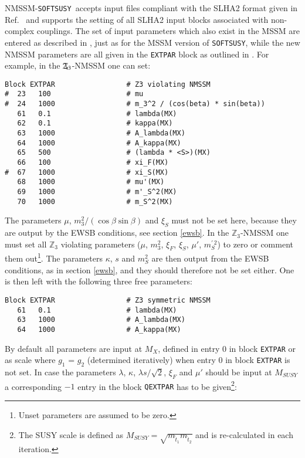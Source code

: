 \documentclass[final,3p,times,pdflatex]{elsarticle}
\def\SOFTSUSY{{\tt SOFTSUSY}}
\def\code#1{\small{\tt #1}\normalsize}
\newcommand{\Zv}{\,\mathbf{\backslash}\mkern-11.0mu{\mathbb{Z}}_{3}} %
\begin{document}
NMSSM-\SOFTSUSY\ accepts input files compliant with the SLHA2 format
given in Ref.~\cite{Allanach:2008qq} and supports the setting of all
SLHA2 input blocks associated with non-complex couplings.  The set of
input parameters which also exist in the MSSM are entered as described
in \cite{Skands:2003cj}, just as for the MSSM version of \SOFTSUSY,
while the new NMSSM parameters are all given in the \code{EXTPAR}
block as outlined in \cite{Allanach:2008qq}.  For example, in the
$\Zv$-NMSSM one can set:
%
\begin{verbatim}
Block EXTPAR                 # Z3 violating NMSSM
#  23   100                  # mu
#  24   1000                 # m_3^2 / (cos(beta) * sin(beta))
   61   0.1                  # lambda(MX)
   62   0.1                  # kappa(MX)
   63   1000                 # A_lambda(MX)
   64   1000                 # A_kappa(MX)
   65   500                  # (lambda * <S>)(MX)
   66   100                  # xi_F(MX)
#  67   1000                 # xi_S(MX)
   68   1000                 # mu'(MX)
   69   1000                 # m'_S^2(MX)
   70   1000                 # m_S^2(MX)
\end{verbatim}
%
The parameters $\mu$, $m_3^2 / (\cos\beta \sin\beta)$ and $\xi_S$ must
not be set here, because they are output by the EWSB conditions, see
section \ref{ewsb}.  In the $\mathbb{Z}_3$-NMSSM one must set
all $\mathbb{Z}_3$ violating parameters ($\mu$, $m_3^2$, $\xi_F$,
$\xi_S$, $\mu'$, $m_S^{\prime\, 2}$) to zero or comment them
out\footnote{Unset parameters are assumed to be zero.}.  The parameters
$\kappa$, $s$ and $m_S^2$ are then 
output from the EWSB conditions, as in section \ref{ewsb}, and they should
therefore not be set either.  One is then left with the following three
free parameters:
%
\begin{verbatim}
Block EXTPAR                 # Z3 symmetric NMSSM
   61   0.1                  # lambda(MX)
   63   1000                 # A_lambda(MX)
   64   1000                 # A_kappa(MX)
\end{verbatim}
%
By default all parameters are input at $M_X$, defined in entry $0$ in
block \code{EXTPAR} or as scale where $g_1$ = $g_2$ (determined iteratively) when entry $0$ in block \code{EXTPAR} is not set.    In case the parameters $\lambda$, $\kappa$,
$\lambda s / \sqrt{2}$, $\xi_F$ and $\mu'$ should be input at
$M_{SUSY}$ a corresponding $-1$ entry in the block \code{QEXTPAR} has
to be given\footnote{The SUSY scale is defined as $M_{SUSY} =
  \sqrt{m_{\tilde{t}_1} m_{\tilde{t}_2}}$ and is re-calculated in each
  iteration.}:
\end{document}
